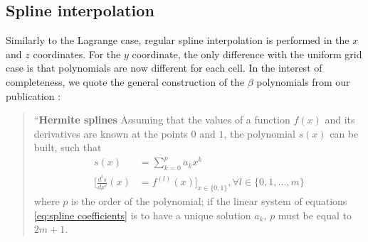 \documentclass[11pt]{article}
\begin{document}
\subsection{Spline interpolation}
Similarly to the Lagrange case, regular spline interpolation is performed in the $x$ and $z$ coordinates.
For the $y$ coordinate, the only difference with the uniform grid case is that polynomials are now different for
each cell.
In the interest of completeness, we quote the general construction of the $\beta$ polynomials from our
publication \cite{channel_paper}:

\begin{quotation}
    ``\textbf{Hermite splines}
        Assuming that the values of a function $f(x)$ and its derivatives are known at the points $0$ and $1$,
        the polynomial $s(x)$ can be built, such that
        \begin{align}
            s(x) &= \sum_{k = 0}^p a_k x^k \\
            \Biggr[\frac{d^l s}{dx^l} (x) &=
             f^{(l)}(x)\Biggr]_{x \in \{0, 1\}}, \forall l \in \{0, 1, \ldots, m\}
            \label{eq:spline coefficients}
        \end{align}
        where $p$ is the order of the polynomial; if the linear system of equations \eqref{eq:spline
        coefficients} is to have a unique solution $a_k$, $p$ must be equal to $2m+1$.


\end{quotation}
\end{document}
